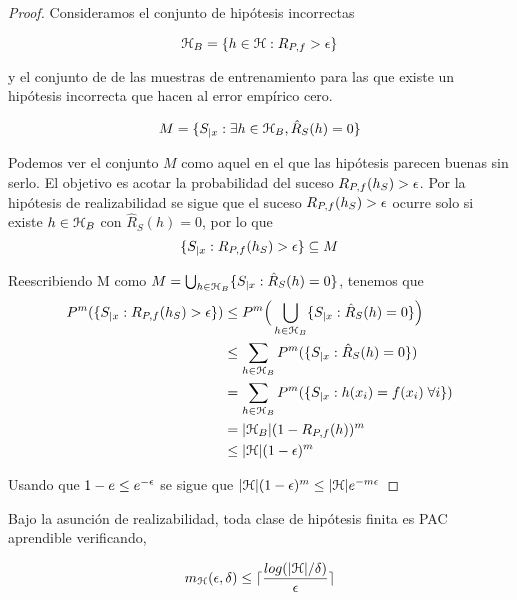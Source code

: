     \begin{proof}
     Consideramos el conjunto de hipótesis incorrectas
         
         \begin{equation}
             \mathcal{H}_B = \{ h \in \mathcal{H} : R_{P,f} > \epsilon\}
         \end{equation}
    
    \noindent y el conjunto de de las muestras de entrenamiento para las que existe un hipótesis incorrecta que hacen al error empírico cero. 
    
        \begin{equation}
            M = \{ S_{|x} : \exists h \in \mathcal{H}_B , \hat{R}_S(h) = 0 \}
        \end{equation}
 
    Podemos ver el conjunto $M$ como aquel en el que las hipótesis parecen buenas sin serlo. El objetivo es acotar la probabilidad del suceso $R_{P,f}(h_S) > \epsilon$. Por la hipótesis de realizabilidad se sigue que el suceso $R_{P,f}(h_S) > \epsilon$ ocurre solo si existe $h\in \mathcal{H}_B$ con $\hat{R}_S(h) = 0$, por lo que
    \begin{equation}
        \{S_{|x}: R_{P,f}(h_S) > \epsilon \} \subseteq M
    \end{equation}
    
    \noindent Reescribiendo M como $M = \bigcup_{h \in \mathcal{H}_B}\{ S_{|x}: \hat{R}_S(h) = 0\}$, tenemos que     
    \begin{equation}
        \begin{aligned}
            P^m(\{ S_{|x}:R_{P,f}(h_S) > \epsilon \}) & \leq  P^m\Big(\bigcup_{h \in \mathcal{H}_B} \{ S_{|x}:\hat{R}_S(h) = 0 \} \Big) \\
            & \leq \sum_{h \in \mathcal{H}_B} P^m(\{ S_{|x}:\hat{R}_S(h) = 0 \} ) \\
            & = \sum_{h \in \mathcal{H}_B} P^m(\{ S_{|x}: h(x_i) = f(x_i) \; \forall i \} ) \\
            & = |\mathcal{H}_B| (1 - R_{P,f}(h))^m  \\
            & \leq  |\mathcal{H}| (1 - \epsilon)^m  \\
        \end{aligned}
    \end{equation}

    \noindent Usando que $1 - e \leq e^{-\epsilon}$ se sigue que $|\mathcal{H}| (1 - \epsilon)^m  \leq |\mathcal{H}|e^{-m \epsilon}$
    
    \end{proof}

    
    \begin{corolario}
    Bajo la asunción de realizabilidad, toda clase de hipótesis finita es PAC aprendible verificando, 
    
    \begin{equation}
        m_{\mathcal{H}} (\epsilon, \delta) \leq \lceil \frac{log(|\mathcal{H}|/\delta)}{\epsilon} \rceil
    \end{equation}
    
    \end{corolario}
    
